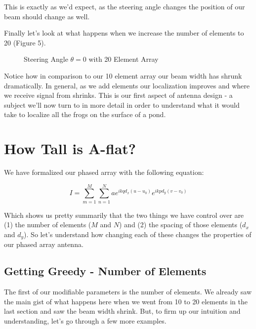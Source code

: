\documentclass[12pt,a6paper]{book}
\begin{document}
This is exactly as we'd expect, as the steering angle changes the position of our beam should change as well. 

Finally let's look at what happens when we increase the number of elements to 20 (Figure 5).

\begin{figure}[!htb]
\caption{\label{fig:my-label} Steering Angle $\theta=0$ with 20 Element Array}
\end{figure}

Notice how in comparison to our 10 element array our beam width has shrunk dramatically. In general, as we add elements our localization improves and where we receive signal from shrinks. This is our first aspect of antenna design - a subject we'll now turn to in more detail in order to understand what it would take to localize all the frogs on the surface of a pond. 

\clearpage


\chapter{How Tall is A-flat?}
We have formalized our phased array with the following equation:

\begin{equation}
I=\sum_{m=1}^M \sum_{n=1}^N  ae^{ikqd_x(u-u_0)}e^{ikpd_y(v-v_0)}
\end{equation}

Which shows us pretty summarily that the two things we have control over are (1) the number of elements ($M$ and $N$) and (2) the spacing of those elements ($d_x$ and $d_y$). So let's understand how changing each of these changes the properties of our phased array antenna. 

\section{Getting Greedy - Number of Elements}
The first of our modifiable parameters is the number of elements. We already saw the main gist of what happens here when we went from 10 to 20 elements in the last section and saw the beam width shrink. But, to firm up our intuition and understanding, let's go through a few more examples. 
\end{document}
